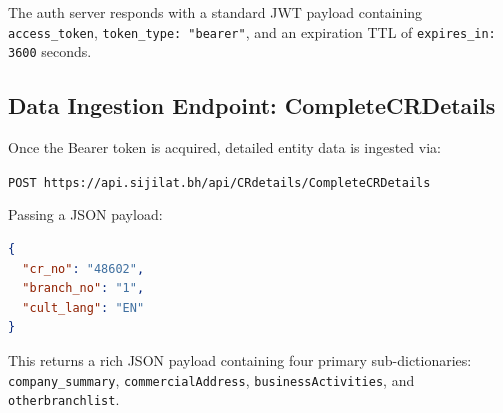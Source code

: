 \documentclass[11pt,a4paper]{article}
\begin{document}
The auth server responds with a standard JWT payload containing \texttt{access\_token}, \texttt{token\_type: "bearer"}, and an expiration TTL of \texttt{expires\_in: 3600} seconds.

\subsection{Data Ingestion Endpoint: CompleteCRDetails}
Once the Bearer token is acquired, detailed entity data is ingested via:
\begin{center}
    \texttt{POST https://api.sijilat.bh/api/CRdetails/CompleteCRDetails}
\end{center}

Passing a JSON payload:
\begin{lstlisting}[language=json]
{
  "cr_no": "48602",
  "branch_no": "1",
  "cult_lang": "EN"
}
\end{lstlisting}

This returns a rich JSON payload containing four primary sub-dictionaries: \texttt{company\_summary}, \texttt{commercialAddress}, \texttt{businessActivities}, and \texttt{otherbranchlist}.
\end{document}
